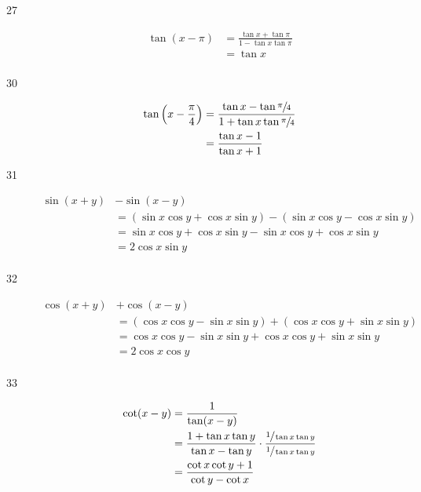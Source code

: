 \documentclass{exam}
\begin{document}
\begin{description}
      \item[27] 
        \begin{align*}
          \tan(x - \pi) & = \frac{\tan x + \tan \pi}{1 - \tan x \tan \pi} \\
                        & = \tan x \\
        \end{align*}

      \item[30] 
        \begin{align*}
          \tan \left(x - \frac{\pi}{4} \right) & = \frac{\tan x - \tan \sfrac{\pi}{4}}{1 + \tan x \tan \sfrac{\pi}{4}} \\
                                               & = \frac{\tan x - 1}{\tan x + 1} \\
        \end{align*}

      \item[31] 
        \begin{align*}
          \sin(x + y) & - \sin(x - y) \\
                      & = (\sin x \cos y + \cos x \sin y) - (\sin x \cos y - \cos x \sin y) \\
                      & = \sin x \cos y + \cos x \sin y - \sin x \cos y + \cos x \sin y \\
                      & = 2 \cos x \sin y \\
        \end{align*}

      \item[32] 
        \begin{align*}
          \cos(x + y) & + \cos(x - y) \\
                      & = (\cos x \cos y - \sin x \sin y) + (\cos x \cos y + \sin x \sin y) \\
                      & = \cos x \cos y - \sin x \sin y + \cos x \cos y + \sin x \sin y \\
                      & = 2 \cos x \cos y \\
        \end{align*}

      \item[33] 
        \begin{align*}
          \cot(x - y) & = \frac{1}{\tan(x - y)} \\
                      & = \frac{1 + \tan x \tan y}{\tan x - \tan y} \cdot \frac{\sfrac{1}{\tan x \tan y}}{\sfrac{1}{\tan x \tan y}} \\
                      & = \frac{\cot x \cot y + 1}{\cot y - \cot x} \\
        \end{align*}


\end{description}
\end{document}
